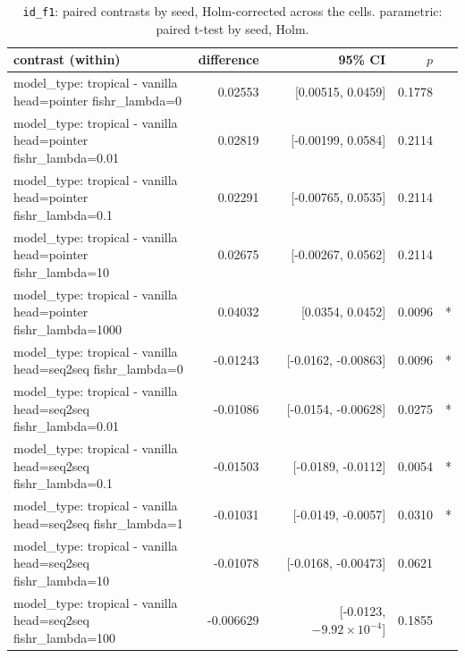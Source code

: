 \documentclass[10pt]{article}
\makeatletter
\newcommand{\stackcell}[1]{\begin{tabular}[t]{@{}l@{}}#1\end{tabular}}
\makeatother
\begin{document}
{\small
\begin{longtable}{lrrrl}
\caption{\texttt{id\_f1}: paired contrasts by seed, Holm-corrected across the cells. parametric: paired t-test by seed, Holm.}\label{tab:paired-id_f1}\\
\toprule
contrast (within) & difference & 95\% CI & $p$ & \\
\midrule
\endhead
\stackcell{model\_type: tropical - vanilla\\\footnotesize head=pointer fishr\_lambda=0 } & 0.02553 & [0.00515, 0.0459] & 0.1778 & \\
\stackcell{model\_type: tropical - vanilla\\\footnotesize head=pointer fishr\_lambda=0.01 } & 0.02819 & [-0.00199, 0.0584] & 0.2114 & \\
\stackcell{model\_type: tropical - vanilla\\\footnotesize head=pointer fishr\_lambda=0.1 } & 0.02291 & [-0.00765, 0.0535] & 0.2114 & \\
\stackcell{model\_type: tropical - vanilla\\\footnotesize head=pointer fishr\_lambda=10 } & 0.02675 & [-0.00267, 0.0562] & 0.2114 & \\
\stackcell{model\_type: tropical - vanilla\\\footnotesize head=pointer fishr\_lambda=1000 } & 0.04032 & [0.0354, 0.0452] & 0.0096 & *\\
\stackcell{model\_type: tropical - vanilla\\\footnotesize head=seq2seq fishr\_lambda=0 } & -0.01243 & [-0.0162, -0.00863] & 0.0096 & *\\
\stackcell{model\_type: tropical - vanilla\\\footnotesize head=seq2seq fishr\_lambda=0.01 } & -0.01086 & [-0.0154, -0.00628] & 0.0275 & *\\
\stackcell{model\_type: tropical - vanilla\\\footnotesize head=seq2seq fishr\_lambda=0.1 } & -0.01503 & [-0.0189, -0.0112] & 0.0054 & *\\
\stackcell{model\_type: tropical - vanilla\\\footnotesize head=seq2seq fishr\_lambda=1 } & -0.01031 & [-0.0149, -0.0057] & 0.0310 & *\\
\stackcell{model\_type: tropical - vanilla\\\footnotesize head=seq2seq fishr\_lambda=10 } & -0.01078 & [-0.0168, -0.00473] & 0.0621 & \\
\stackcell{model\_type: tropical - vanilla\\\footnotesize head=seq2seq fishr\_lambda=100 } & -0.006629 & [-0.0123, $-9.92\times10^{-4}$] & 0.1855 & \\

\end{longtable}}
\end{document}
